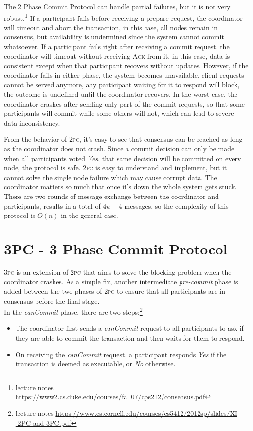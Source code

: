 \documentclass[11pt]{article}
\begin{document}
    The 2 Phase Commit Protocol can handle partial failures, but it is not very robust.\footnote{\label{}lecture notes \url{https://www2.cs.duke.edu/courses/fall07/cps212/consensus.pdf}} If a participant fails before receiving a prepare request, the coordinator will timeout and abort the transaction, in this case, all nodes remain in consensus, but availability is undermined since the system cannot commit whatsoever. If a participant fails right after receiving a commit request, the coordinator will timeout without receiving \textsc{Ack} from it, in this case, data is consistent except when that participant recovers without updates. However, if the coordinator fails in either phase, the system becomes unavailable, client requests cannot be served anymore, any participant waiting for it to respond will block, the outcome is undefined until the coordinator recovers. In the worst case, the coordinator crashes after sending only part of the commit requests, so that some participants will commit while some others will not, which can lead to severe data inconsistency.

    From the behavior of \textsc{2pc}, it's easy to see that consensus can be reached as long as the coordinator does not crash. Since a commit decision can only be made when all participants voted \textit{Yes}, that same decision will be committed on every node, the protocol is safe. \textsc{2pc} is easy to understand and implement, but it cannot solve the single node failure which may cause corrupt data. The coordinator matters so much that once it's down the whole system gets stuck. There are two rounds of message exchange between the coordinator and participants, results in a total of $4n - 4$ messages, so the complexity of this protocol is $O(n)$ in the general case.

  \section{3PC - 3 Phase Commit Protocol}
    \textsc{3pc} is an extension of \textsc{2pc} \normalsize that aims to solve the blocking problem when the coordinator crashes. As a simple fix, another intermediate \textit{pre-commit} phase is added between the two phases of \textsc{2pc} \normalsize to ensure that all participants are in consensus before the final stage.\autocite{i3pc}\\

    In the \textit{canCommit} phase, there are two steps:\footnote{\label{}lecture notes \url{https://www.cs.cornell.edu/courses/cs5412/2012sp/slides/XI -2PC and 3PC.pdf}}
    \begin{itemize}
      \item The coordinator first sends a \textit{canCommit} request to all participants to ask if they are able to commit the transaction and then waits for them to respond.
      \item On receiving the \textit{canCommit} request, a participant responds \textit{Yes} if the transaction is deemed as executable, or \textit{No} otherwise.
    \end{itemize}
\end{document}
